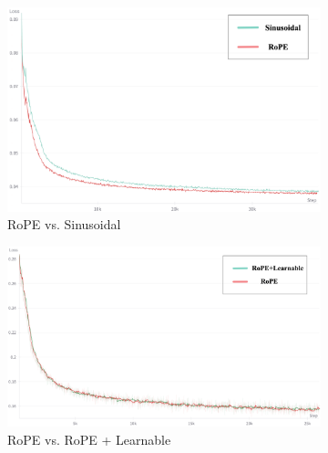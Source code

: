 \begin{figure}[h]
    \centering
    \begin{subfigure}[b]{0.46\textwidth}
        \includegraphics[width=\textwidth]{images/ab_sr.png}
        \caption{RoPE vs. Sinusoidal}
        \label{fig:rope-sin}
    \end{subfigure}
    \begin{subfigure}[b]{0.48\textwidth}
        \includegraphics[width=\textwidth]{images/ab_rl.png}
        \caption{RoPE vs. RoPE + Learnable}
        \label{fig:rope-learnable}
    \end{subfigure}
    \begin{subfigure}[b]{0.46\textwidth}

\end{subfigure}
\end{figure}
